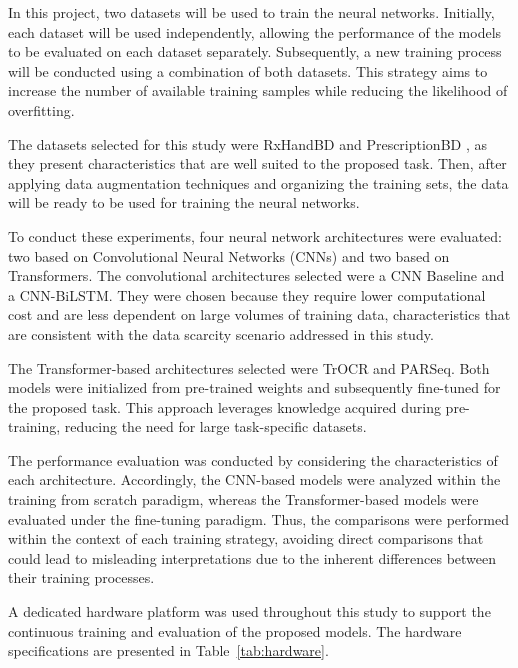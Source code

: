 \documentclass[11pt,a4paper]{article}
\begin{document}
In this project, two datasets will be used to train the neural networks. Initially, each dataset will be used independently, allowing the performance of the models to be evaluated on each dataset separately. Subsequently, a new training process will be conducted using a combination of both datasets. This strategy aims to increase the number of available training samples while reducing the likelihood of overfitting.

The datasets selected for this study were RxHandBD \cite{islam2026rxhandbd} and PrescriptionBD \cite{abdur_rahim_mia_abdullah_al_mamun_abdullah_al_sajid_aurunave_mollik_ruddra_2024}, as they present characteristics that are well suited to the proposed task. Then, after applying data augmentation techniques and organizing the training sets, the data will be ready to be used for training the neural networks.

To conduct these experiments, four neural network architectures were evaluated: two based on Convolutional Neural Networks (CNNs) and two based on Transformers. The convolutional architectures selected were a CNN Baseline and a CNN-BiLSTM. They were chosen because they require lower computational cost and are less dependent on large volumes of training data, characteristics that are consistent with the data scarcity scenario addressed in this study.

The Transformer-based architectures selected were TrOCR and PARSeq. Both models were initialized from pre-trained weights and subsequently fine-tuned for the proposed task. This approach leverages knowledge acquired during pre-training, reducing the need for large task-specific datasets.

The performance evaluation was conducted by considering the characteristics of each architecture. Accordingly, the CNN-based models were analyzed within the training from scratch paradigm, whereas the Transformer-based models were evaluated under the fine-tuning paradigm. Thus, the comparisons were performed within the context of each training strategy, avoiding direct comparisons that could lead to misleading interpretations due to the inherent differences between their training processes.

A dedicated hardware platform was used throughout this study to support the continuous training and evaluation of the proposed models. The hardware specifications are presented in Table~\ref{tab:hardware}.
\end{document}
